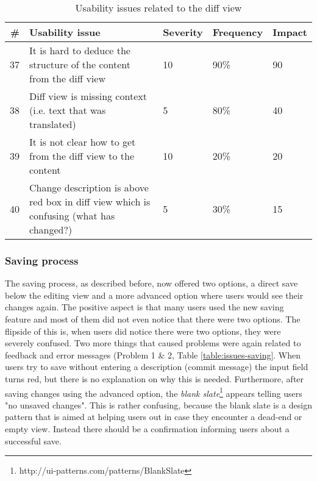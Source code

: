 \begin{table}[h!]
\centering
\begin{tabular}{|r|p{7cm}|l|l|l|}
\hline
\rowcolor[HTML]{EFEFEF}
{\bf \#} & {\bf Usability issue} & {\bf Severity} & {\bf Frequency} & {\bf Impact} \\ \hline
37 & It is hard to deduce the structure of the content from the diff view & 10 & 90\% & 90 \\ \hline
38 & Diff view is missing context (i.e. text that was translated) & 5 & 80\% & 40 \\ \hline
39 & It is not clear how to get from the diff view to the content & 10 & 20\% & 20 \\ \hline
40 & Change description is above red box in diff view which is confusing (what has changed?) & 5 & 30\% & 15 \\ \hline
\end{tabular}
\caption{Usability issues related to the diff view}
\label{table:issues-diff-2nd}
\end{table}


\subsubsection{Saving process}
The saving process, as described before, now offered two options, a direct save below the editing view and a more advanced option where users would see their changes again. The positive aspect is that many users used the new saving feature and most of them did not even notice that there were two options. The flipside of this is, when users did notice there were two options, they were severely confused.
Two more things that caused problems were again related to feedback and error messages (Problem 1 \& 2, Table \ref{table:issues-saving}. When users try to save without entering a description (commit message) the input field turns red, but there is no explanation on why this is needed. Furthermore, after saving changes using the advanced option, the \textit{blank slate}\footnote{http://ui-patterns.com/patterns/BlankSlate} appears telling users "no unsaved changes". This is rather confusing, because the blank slate is a design pattern that is aimed at helping users out in case they encounter a dead-end or empty view. Instead there should be a confirmation informing users about a successful save.

